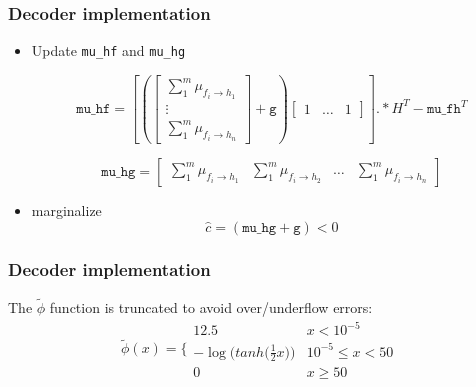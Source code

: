 \documentclass[]{beamer}
\begin{document}
\begin{frame}
\transwipe[direction=0]
\frametitle{Decoder implementation}
\begin{itemize}
\item Update \texttt{mu\_hf} and {\texttt{mu\_hg}} 

\begin{equation*}
\texttt{mu\_hf} = \left[ \left(\begin{bmatrix} \sum_1^m \mu_{f_i \rightarrow h_1} \\ \vdots \\ \sum_1^m \mu_{f_i \rightarrow h_n} \end{bmatrix} + \texttt{g} \right) \begin{bmatrix} 1 & \dots & 1 \end{bmatrix} \right] .* H^T - \texttt{mu\_fh}^T
\end{equation*}		

\begin{equation*}
\texttt{mu\_hg} = \begin{bmatrix} \sum_1^m \mu_{f_i \rightarrow h_1} & \sum_1^m \mu_{f_i \rightarrow h_2} & \dots & \sum_1^m \mu_{f_i \rightarrow h_n} \end{bmatrix} 
\end{equation*}

\vspace{0.3cm}

\item marginalize
\begin{equation*}
		\hat c = (\texttt{mu\_hg}+\texttt{g})<0
	\end{equation*}


\end{itemize}

		
\end{frame}

\begin{frame}
\transwipe[direction=0]
\frametitle{Decoder implementation}

The $\tilde \phi$ function is truncated to avoid over/underflow errors:
\begin{equation*}
\tilde \phi (x) = \Bigg\{
	\begin{array}{ll}
		12.5 & x < 10^{-5} \\
		-\log \big ( tanh \big( \frac{1}{2}x\big) \big ) & 10^{-5} \leq x < 50 \\
		0 & x \geq 50
	\end{array}
\end{equation*}

\end{frame}
\end{document}
